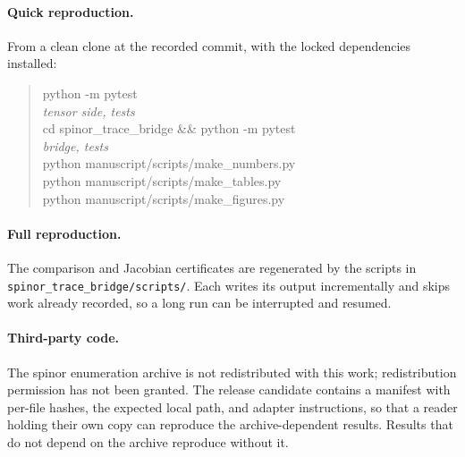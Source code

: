 

\paragraph{Quick reproduction.} From a clean clone at the recorded commit, with
the locked dependencies installed:
\begin{quote}\small\ttfamily
python -m pytest\\
\hspace*{2em}\textrm{\itshape tensor side, \nTraceTests{} tests}\\
cd spinor\_trace\_bridge \&\& python -m pytest\\
\hspace*{2em}\textrm{\itshape bridge, \nBridgeTests{} tests}\\
python manuscript/scripts/make\_numbers.py\\
python manuscript/scripts/make\_tables.py\\
python manuscript/scripts/make\_figures.py
\end{quote}

\paragraph{Full reproduction.} The comparison and Jacobian certificates are
regenerated by the scripts in \texttt{spinor\_trace\_bridge/scripts/}. Each
writes its output incrementally and skips work already recorded, so a long run
can be interrupted and resumed.

\paragraph{Third-party code.} The spinor enumeration archive is not
redistributed with this work; redistribution permission has not been granted.
The release candidate contains a manifest with per-file hashes, the expected
local path, and adapter instructions, so that a reader holding their own copy can
reproduce the archive-dependent results. Results that do not depend on the
archive reproduce without it.
